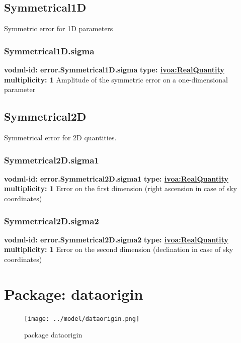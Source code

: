   \subsection{Symmetrical1D}
  \label{sect:error.Symmetrical1D}
    Symmetric error for 1D parameters

    \subsubsection{Symmetrical1D.sigma}
      \textbf{vodml-id: error.Symmetrical1D.sigma} \newline
      \textbf{type: \hyperref[sect:ivoa]{ivoa:RealQuantity}} \newline
      \textbf{multiplicity: 1} \newline
      Amplitude of the symmetric error on a one-dimensional parameter

  \subsection{Symmetrical2D}
  \label{sect:error.Symmetrical2D}
    Symmetrical error for 2D quantities.

    \subsubsection{Symmetrical2D.sigma1}
      \textbf{vodml-id: error.Symmetrical2D.sigma1} \newline
      \textbf{type: \hyperref[sect:ivoa]{ivoa:RealQuantity}} \newline
      \textbf{multiplicity: 1} \newline
      Error on the first dimension (right ascension in case of sky coordinates)

    \subsubsection{Symmetrical2D.sigma2}
      \textbf{vodml-id: error.Symmetrical2D.sigma2} \newline
      \textbf{type: \hyperref[sect:ivoa]{ivoa:RealQuantity}} \newline
      \textbf{multiplicity: 1} \newline
      Error on the second dimension (declination in case of sky coordinates)

\pagebreak
\section{Package: dataorigin }
  \begin{figure}[h]
    \texttt{[image: ../model/dataorigin.png]}
    \caption{package dataorigin}
    \label{fig:dataorigin}
  \end{figure}



